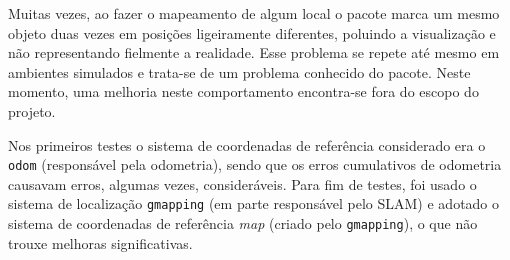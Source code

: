 \begin{compactitem}
\item Muitas vezes, ao fazer o mapeamento de algum local o pacote  marca um mesmo objeto duas vezes em posições ligeiramente diferentes, poluindo a visualização e não representando fielmente a realidade. Esse problema se repete até mesmo em ambientes simulados e trata-se de um problema conhecido do pacote. Neste momento, uma melhoria neste comportamento encontra-se fora do escopo do projeto.
\item Nos primeiros testes o sistema de coordenadas de referência considerado era o \verb|odom| (responsável pela odometria), sendo que os erros cumulativos de odometria causavam erros, algumas vezes, consideráveis. Para fim de testes, foi usado o sistema de localização \verb|gmapping| (em parte responsável pelo SLAM) e adotado o sistema de coordenadas de referência \textit{map} (criado pelo \verb|gmapping|), o que não trouxe melhoras significativas.
\end{compactitem}
